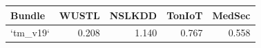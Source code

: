 \begin{tabular}{lrrrr}
\toprule
Bundle & WUSTL & NSLKDD & TonIoT & MedSec \\
\midrule
`tm\_v19` & 0.208 & 1.140 & 0.767 & 0.558 \\
\bottomrule
\end{tabular}
